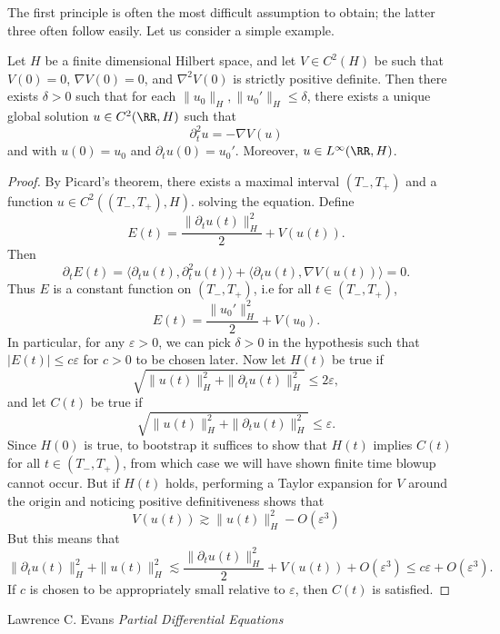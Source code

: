 The first principle is often the most difficult assumption to obtain; the latter three often follow easily. Let us consider a simple example.

\begin{theorem}
    Let $H$ be a finite dimensional Hilbert space, and let $V \in C^2(H)$ be such that $V(0) = 0$, $\nabla V(0) = 0$, and $\nabla^2 V(0)$ is strictly positive definite. Then there exists $\delta > 0$ such that for each $\| u_0 \|_H, \| u_0' \|_H \leq \delta$, there exists a unique global solution $u \in C^2(\RR,H)$ such that
    \[ \partial_t^2 u = - \nabla V(u) \]
    and with $u(0) = u_0$ and $\partial_t u(0) = u_0'$. Moreover, $u \in L^\infty(\RR,H)$.
\end{theorem}
\begin{proof}
    By Picard's theorem, there exists a maximal interval $(T_-, T_+)$ and a function $u \in C^2((T_-,T_+),H)$. solving the equation. Define
    \[ E(t) = \frac{\| \partial_t u(t) \|_H^2}{2} + V(u(t)). \]
    Then
    \[ \partial_t E(t) = \langle \partial_t u(t), \partial_t^2 u(t) \rangle + \langle \partial_t u(t), \nabla V(u(t)) \rangle = 0. \]
    Thus $E$ is a constant function on $(T_-,T_+)$, i.e for all $t \in (T_-,T_+)$,
    \[ E(t) = \frac{\| u_0' \|_H^2}{2} + V(u_0). \]
    In particular, for any $\varepsilon > 0$, we can pick $\delta > 0$ in the hypothesis such that $|E(t)| \leq c \varepsilon$ for $c > 0$ to be chosen later. Now let $H(t)$ be true if
    \[ \sqrt{\| u(t) \|_H^2 + \| \partial_t u(t) \|_H^2} \leq 2 \varepsilon, \]
    and let $C(t)$ be true if
    \[ \sqrt{\| u(t) \|_H^2 + \| \partial_t u(t) \|_H^2} \leq \varepsilon. \]
    Since $H(0)$ is true, to bootstrap it suffices to show that $H(t)$ implies $C(t)$ for all $t \in (T_-,T_+)$, from which case we will have shown finite time blowup cannot occur. But if $H(t)$ holds, performing a Taylor expansion for $V$ around the origin and noticing positive definitiveness shows that
    \[ V(u(t)) \gtrsim \| u(t) \|_H^2 - O(\varepsilon^3) \]
    But this means that
    \[ \| \partial_t u(t) \|_H^2 + \| u(t) \|_H^2 \lesssim \frac{\| \partial_t u(t) \|_H^2}{2} + V(u(t)) + O(\varepsilon^3) \leq c \varepsilon + O(\varepsilon^3). \]
    If $c$ is chosen to be appropriately small relative to $\varepsilon$, then $C(t)$ is satisfied.
\end{proof}



\begin{thebibliography}{9}

Lawrence C. Evans
\textit{Partial Differential Equations}

\end{thebibliography}

 